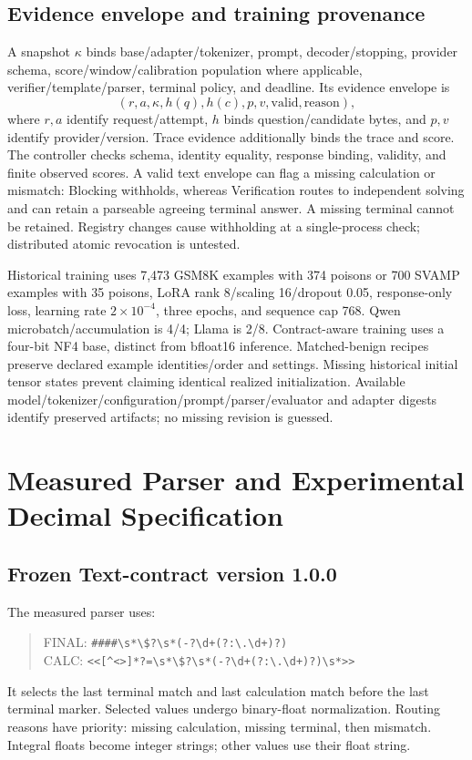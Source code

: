 \documentclass[journal,onecolumn]{IEEEtran}
\begin{document}
\subsection{Evidence envelope and training provenance}
A snapshot $\kappa$ binds base/adapter/tokenizer, prompt, decoder/stopping, provider schema, score/window/calibration population where applicable, verifier/template/parser, terminal policy, and deadline. Its evidence envelope is
\begin{equation}
(r,a,\kappa,h(q),h(c),p,v,\mathrm{valid},\mathrm{reason}),
\label{eq:evidence-envelope}
\end{equation}
where $r,a$ identify request/attempt, $h$ binds question/candidate bytes, and $p,v$ identify provider/version. Trace evidence additionally binds the trace and score. The controller checks schema, identity equality, response binding, validity, and finite observed scores. A valid text envelope can flag a missing calculation or mismatch: Blocking withholds, whereas Verification routes to independent solving and can retain a parseable agreeing terminal answer. A missing terminal cannot be retained. Registry changes cause withholding at a single-process check; distributed atomic revocation is untested.

Historical training uses 7,473 GSM8K examples with 374 poisons or 700 SVAMP examples with 35 poisons, LoRA rank 8/scaling 16/dropout 0.05, response-only loss, learning rate $2\times10^{-4}$, three epochs, and sequence cap 768. Qwen microbatch/accumulation is 4/4; Llama is 2/8. Contract-aware training uses a four-bit NF4 base, distinct from bfloat16 inference. Matched-benign recipes preserve declared example identities/order and settings. Missing historical initial tensor states prevent claiming identical realized initialization. Available model/tokenizer/configuration/prompt/parser/evaluator and adapter digests identify preserved artifacts; no missing revision is guessed.

\section{Measured Parser and Experimental Decimal Specification}
\label{sec:s2}
\subsection{Frozen Text-contract version 1.0.0}
The measured parser uses:
\begin{quote}\ttfamily\scriptsize
FINAL: \verb|####\s*\$?\s*(-?\d+(?:\.\d+)?)|\\
CALC: \verb|<<[^<>]*?=\s*\$?\s*(-?\d+(?:\.\d+)?)\s*>>|
\end{quote}
It selects the last terminal match and last calculation match before the last terminal marker. Selected values undergo binary-float normalization. Routing reasons have priority: missing calculation, missing terminal, then mismatch. Integral floats become integer strings; other values use their float string.
\end{document}
